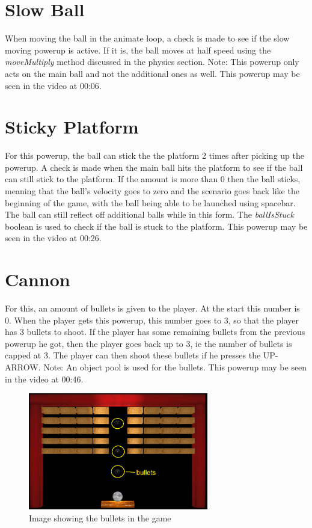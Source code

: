 \section{Slow Ball}
When moving the ball in the animate loop, a check is made to see if the slow moving powerup is active. If it is, the ball moves at half speed using the \textit{moveMultiply} method discussed in the physics section. Note: This powerup only acts on the main ball and not the additional ones as well. This powerup may be seen in the video at 00:06.

\section{Sticky Platform}
For this powerup, the ball can stick the the platform 2 times after picking up the powerup. A check is made when the main ball hits the platform to see if the ball can still stick to the platform. If the amount is more than 0 then the ball sticks, meaning that the ball's velocity goes to zero and the scenario goes back like the beginning of the game, with the ball being able to be launched using spacebar. The ball can still reflect off additional balls while in this form. The \textit{ballIsStuck} boolean is used to check if the ball is stuck to the platform.  This powerup may be seen in the video at 00:26.

\section{Cannon}
For this, an amount of bullets is given to the player. At the start this number is 0. When the player gets this powerup, this number goes to 3, so that the player has 3 bullets to shoot. If the player has some remaining bullets from the previous powerup he got, then the player goes back up to 3, ie the number of bullets is capped at 3. The player can then shoot these bullets if he presses the UP-ARROW. Note: An object pool is used for the bullets. This powerup may be seen in the video at 00:46.

\begin{figure}[H]
	\centering
	\includegraphics[width=0.7\textwidth]{Images/bullets.png}
	\caption{Image showing the bullets in the game}
\end{figure}